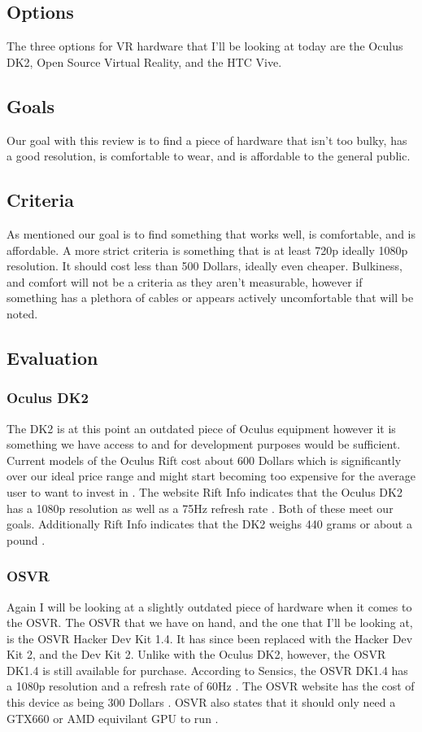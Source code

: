 \documentclass{article}
\begin{document}
\subsection{Options}
The three options for VR hardware that I'll be looking at today are the Oculus DK2, Open Source Virtual Reality, and the HTC Vive. 

\subsection{Goals}
Our goal with this review is to find a piece of hardware that isn't too bulky, has a good resolution, is comfortable to wear, and is affordable to the general public.

\subsection{Criteria}
As mentioned our goal is to find something that works well, is comfortable, and is affordable. 
A more strict criteria is something that is at least 720p ideally 1080p resolution.
It should cost less than 500 Dollars, ideally even cheaper.
Bulkiness, and comfort will not be a criteria as they aren't measurable, however if something has a plethora of cables or appears actively uncomfortable that will be noted.

\subsection{Evaluation}
\subsubsection{Oculus DK2}
The DK2 is at this point an outdated piece of Oculus equipment however it is something we have access to and for development purposes would be sufficient. 
Current models of the Oculus Rift cost about 600 Dollars which is significantly over our ideal price range and might start becoming too expensive for the average user to want to invest in \cite{oculushardware}. 
The website Rift Info indicates that the Oculus DK2 has a 1080p resolution as well as a 75Hz refresh rate \cite{riftinfo}.
Both of these meet our goals.
Additionally Rift Info indicates that the DK2 weighs 440 grams or about a pound \cite{riftinfo}.

\subsubsection{OSVR}
Again I will be looking at a slightly outdated piece of hardware when it comes to the OSVR. 
The OSVR that we have on hand, and the one that I'll be looking at, is the OSVR Hacker Dev Kit 1.4. 
It has since been replaced with the Hacker Dev Kit 2, and the Dev Kit 2.
Unlike with the Oculus DK2, however, the OSVR DK1.4 is still available for purchase.
According to Sensics, the OSVR DK1.4 has a 1080p resolution and a refresh rate of 60Hz \cite{sensicsosvr}.
The OSVR website has the cost of this device as being 300 Dollars \cite{osvrhardware}.
OSVR also states that it should only need a GTX660 or AMD equivilant GPU to run \cite{osvrhardware}.
\end{document}
